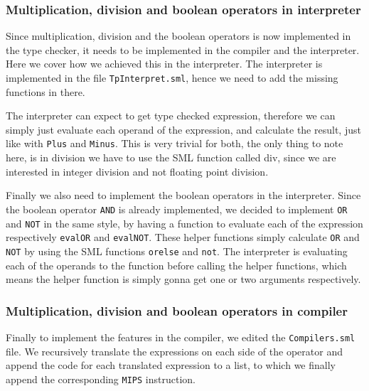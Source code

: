 \documentclass[10pt]{article}
\begin{document}
\subsubsection{Multiplication, division and boolean operators in interpreter}
Since multiplication, division and the boolean operators is now implemented in the type checker, it needs to be implemented in the compiler and the interpreter. Here we cover how we achieved this in the interpreter. The interpreter is implemented in the file \texttt{TpInterpret.sml}, hence we need to add the missing functions in there.

The interpreter can expect to get type checked expression, therefore we can simply just evaluate each operand of the expression, and calculate the result, just like with \texttt{Plus} and \texttt{Minus}. This is very trivial for both, the only thing to note here, is in division we have to use the SML function called div, since we are interested in integer division and not floating point division.

Finally we also need to implement the boolean operators in the interpreter. Since the boolean operator \texttt{AND} is already implemented, we decided to implement \texttt{OR} and \texttt{NOT} in the same style, by having a function to evaluate each of the expression respectively \texttt{evalOR} and \texttt{evalNOT}. These helper functions simply calculate \texttt{OR} and \texttt{NOT} by using the SML functions \texttt{orelse} and \texttt{not}. The interpreter is evaluating each of the operands to the function before calling the helper functions, which means the helper function is simply gonna get one or two arguments respectively.

\subsubsection{Multiplication, division and boolean operators in compiler}
Finally to implement the features in the compiler, we edited the \texttt{Compilers.sml} file. We recursively translate the expressions on each side of the operator and append the code for each translated expression to a list, to which we finally append the corresponding \texttt{MIPS} instruction.

\end{document}

